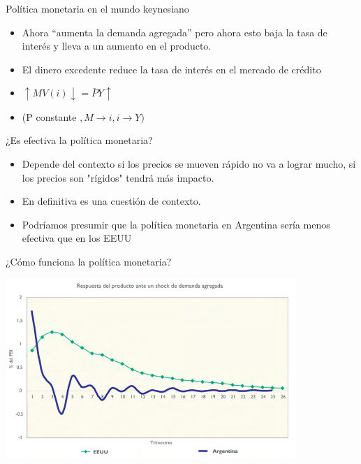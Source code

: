 \documentclass{beamer}
\begin{document}
\begin{frame}{Política monetaria en el mundo keynesiano}

\begin{itemize}
    \item Ahora “aumenta la demanda agregada” pero ahora esto baja la tasa de interés y lleva a un aumento en el producto.
    \item El dinero excedente reduce la tasa de interés en el mercado de crédito
    \item $\uparrow M V(i) \downarrow=\bar{P} Y \uparrow$
    \item (P constante $, M \rightarrow i, i \rightarrow Y)$
\end{itemize}
 

\end{frame}

\begin{frame}{¿Es efectiva la política monetaria?}

    \begin{itemize}
        \item Depende del contexto si los precios se mueven rápido no va a lograr mucho, si los precios son "rígidos" tendrá más impacto. 
        \item En definitiva es una cuestión de contexto.
        \item Podríamos presumir que la política monetaria en Argentina sería menos efectiva que en los EEUU

    \end{itemize}
    
\end{frame}

\begin{frame}{¿Cómo funciona la política monetaria?}
    
    \centering\includegraphics[width=11cm]{../Figures/C40.8.png}\

\end{frame}
\end{document}
